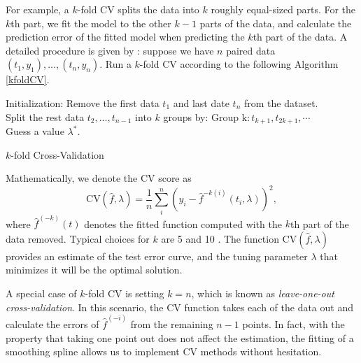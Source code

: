 For example, a $k$-fold CV splits the data into $k$ roughly equal-sized parts. For the $k$th part, we fit the model to the other $k-1$ parts of the data, and calculate the prediction error of the fitted model when predicting the $k$th part of the data. A detailed procedure is given by \cite{wahba1975completely}: suppose we have $n$ paired data $(t_1,y_1), \ldots, (t_n,y_n)$. Run a $k$-fold CV according to the following Algorithm \ref{kfoldCV}. 
\begin{algorithm}[h]
\SetAlgoLined 
Initialization: Remove the first data $t_1$ and last date $t_n$ from the dataset. \\
Split the rest data $t_2,\ldots,t_{n-1}$ into $k$ groups by: $ \mbox{Group k} : t_{k+1}, t_{2k+1}, \cdots$ \\
Guess a value $\lambda^*$. \\
\caption{$k$-fold Cross-Validation}\label{kfoldCV}
\end{algorithm}
Mathematically, we denote the CV score as 
\begin{equation*}
\mbox{CV}(\hat{f},\lambda) = \frac{1}{n}\sum_i^n \left( y_i -\hat{f}^{-k(i)}(t_i,\lambda) \right)^2,
\end{equation*}
where $\hat{f}^{(-k)}(t)$ denotes the fitted function computed with the $k$th part of the data removed. Typical choices for $k$ are 5 and 10 \cite{esl2009}.  The function $\mbox{CV}(\hat{f},\lambda)$ provides an estimate of the test error curve, and the tuning parameter $\lambda$ that minimizes it will be the optimal solution. 

A special case of $k$-fold CV is setting $k=n$, which is known as \textit{leave-one-out cross-validation}. In this scenario, the CV function takes each of the data out and calculate the errors of $\hat{f}^{(-i)}$ from the remaining $n-1$ points. In fact, with the property that taking one point out does not affect the estimation, the fitting of a smoothing spline allows us to implement CV methods without hesitation. 


